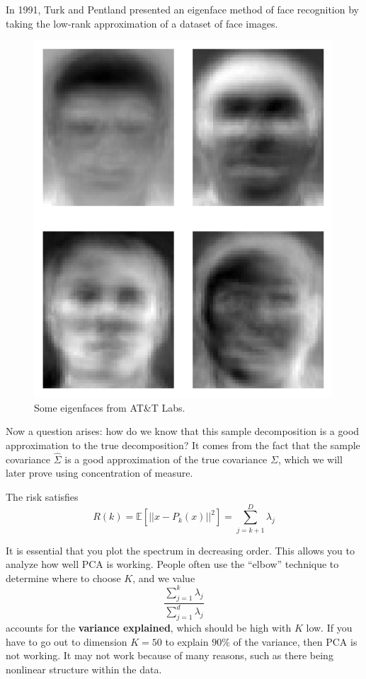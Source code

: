 \documentclass{article}
\begin{document}
  \begin{example}[Eigenfaces]
    In 1991, Turk and Pentland presented an eigenface method of face recognition by taking the low-rank approximation of a dataset of face images. 

    \begin{figure}[H]
      \centering 
      \includegraphics[scale=0.3]{img/eigenfaces.png}
      \caption{Some eigenfaces from AT\&T Labs. } 
      \label{fig:eigenfaces}
    \end{figure}
  \end{example}

  Now a question arises: how do we know that this sample decomposition is a good approximation to the true decomposition? It comes from the fact that the sample covariance $\hat{\Sigma}$ is a good approximation of the true covariance $\Sigma$, which we will later prove using concentration of measure. 

  \begin{theorem}[Risk]
    The risk satisfies 
    \begin{equation}
      R(k) = \mathbb{E}[|| x - P_k (x) ||^2 ] = \sum_{j=k+1}^D \lambda_j 
    \end{equation}
  \end{theorem}

  It is essential that you plot the spectrum in decreasing order. This allows you to analyze how well PCA is working. People often use the ``elbow'' technique to determine where to choose $K$, and we value 
  \begin{equation}
    \frac{\sum_{j=1}^k \lambda_j}{\sum_{j=1}^d \lambda_j} 
  \end{equation}
  accounts for the \textbf{variance explained}, which should be high with $K$ low. If you have to go out to dimension $K=50$ to explain $90\%$ of the variance, then PCA is not working. It may not work because of many reasons, such as there being nonlinear structure within the data. 
\end{document}
